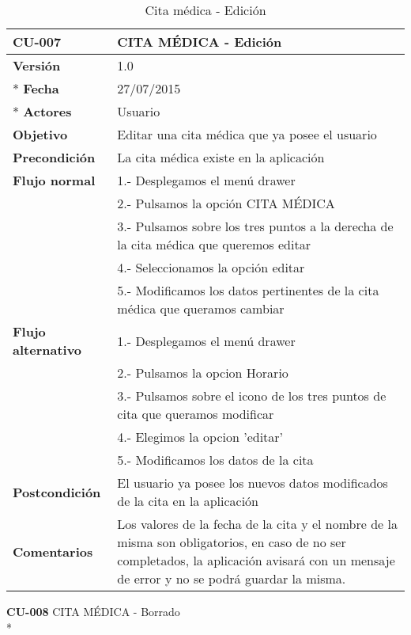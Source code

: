\documentclass[../pfc.tex]{subfiles}
\begin{document}
		\begin{table}[H]
			\centering
			\begin{tabular}[t]{|p{3cm}|p{9.5cm}|}
				\hline \textbf{CU-007} & \textbf{CITA MÉDICA - Edición} \\*
				\hline\hline \textbf{Versión} & 1.0 \\ *
				\hline\hline \textbf{Fecha} & 27/07/2015 \\ *
				\hline\textbf{Actores} 	& Usuario\\*
				\hline \textbf{Objetivo} & Editar una cita médica que ya posee el usuario\\* 			
				\hline \textbf{Precondición} & La cita médica existe en la aplicación\\* 
				\hline \textbf{Flujo normal} & 1.- Desplegamos el menú drawer \\* 
				& 2.- Pulsamos la opción CITA MÉDICA\\*	
				& 3.- Pulsamos sobre los tres puntos a la derecha de la cita médica que queremos editar\\*	
				& 4.- Seleccionamos la opción editar\\*	
				& 5.- Modificamos los datos pertinentes de la cita médica que queramos cambiar\\*	
				\hline \textbf{Flujo alternativo} & 1.- Desplegamos el menú drawer \\* 
				& 2.- Pulsamos la opcion Horario \\*	
				& 3.- Pulsamos sobre el icono de los tres puntos de cita que queramos modificar \\*	
				& 4.- Elegimos la opcion 'editar'\\*	
				& 5.- Modificamos los datos de la cita\\*	
				\hline \textbf{Postcondición} & El usuario ya posee los nuevos datos modificados de la cita en la aplicación \\* 
				\hline \textbf{Comentarios}   & Los valores de la fecha de la cita y el nombre de la misma son obligatorios, en caso de no ser completados, la aplicación avisará con un mensaje de error y no se podrá guardar la misma.\\*
				\hline
			\end{tabular}
			\caption{Cita médica - Edición}
			\label{tabla:caso007}
		\end{table}
	
	\textbf{CU-008}	CITA MÉDICA - Borrado\\*
	
\end{document}

